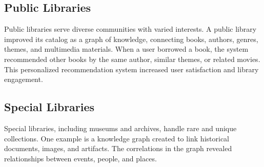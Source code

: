 \documentclass[12pt,a4paper]{article}
\begin{document}
\subsection{Public Libraries}
Public libraries serve diverse communities with varied interests. A public library improved its catalog as a graph of knowledge, connecting books, authors, genres, themes, and multimedia materials. When a user borrowed a book, the system recommended other books by the same author, similar themes, or related movies. This personalized recommendation system increased user satisfaction and library engagement.

\subsection{Special Libraries}
Special libraries, including museums and archives, handle rare and unique collections. One example is a knowledge graph created to link historical documents, images, and artifacts. The correlations in the graph revealed relationships between events, people, and places.
\end{document}
